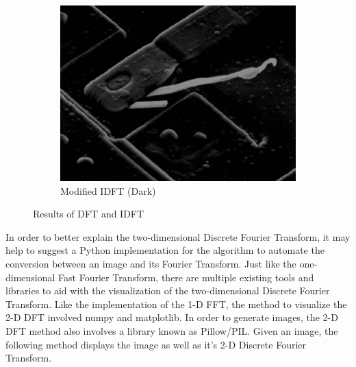 \documentclass{amsproc}
\begin{document}
\begin{figure}[h]
\begin{subfigure}{.3\textwidth}
	\includegraphics[scale=.25]{dftimage3.png}
	\caption{Modified IDFT (Dark)}
	\label{fig:sub10}
\end{subfigure}
\caption{Results of DFT and IDFT}
\label{fig:im2}
\end{figure}

In order to better explain the two-dimensional Discrete Fourier Transform, it may help to suggest a Python implementation for the algorithm to automate the conversion between an image and its Fourier Transform. Just like the one-dimensional Fast Fourier Transform, there are multiple existing tools and libraries to aid with the visualization of the two-dimensional Discrete Fourier Transform. Like the implementation of the 1-D FFT, the method to visualize the 2-D DFT involved numpy and matplotlib. In order to generate images, the 2-D DFT method also involves a library known as Pillow/PIL. Given an image, the following method displays the image as well as it's 2-D Discrete Fourier Transform. 
\end{document}

